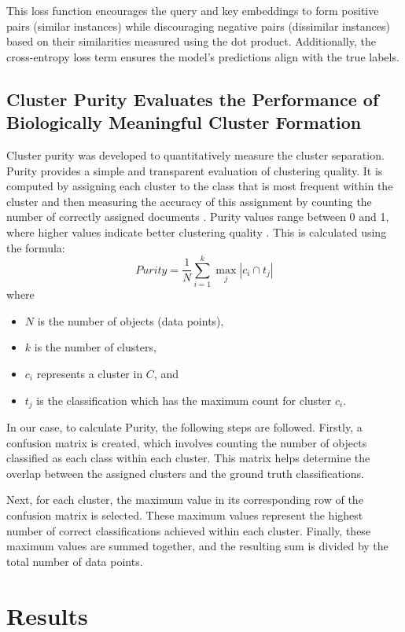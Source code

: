 \documentclass[12pt,a4paper]{article}
\begin{document}
This loss function encourages the query and key embeddings to form positive pairs (similar instances) while discouraging negative pairs (dissimilar instances) based on their similarities measured using the dot product. Additionally, the cross-entropy loss term ensures the model's predictions align with the true labels.

\subsection{Cluster Purity Evaluates the Performance of Biologically Meaningful Cluster Formation}
\label{cp}

Cluster purity was developed to quantitatively measure the cluster separation. Purity provides a simple and transparent evaluation of clustering quality. It is computed by assigning each cluster to the class that is most frequent within the cluster and then measuring the accuracy of this assignment by counting the number of correctly assigned documents \cite{ISBN_0521865719}. Purity values range between 0 and 1, where higher values indicate better clustering quality \cite{ISBN_0521865719}. This is calculated using the formula:
$$
Purity = \frac{1}{N} \sum_{i=1}^{k} \max_j |c_i \cap t_j|
$$
where
\begin{itemize}
	\item $N$ is the number of objects (data points),
	\item $k$ is the number of clusters,
	\item $c_i$ represents a cluster in $C$, and
	\item $t_j$ is the classification which has the maximum count for cluster $c_i$.
\end{itemize}

In our case, to calculate Purity, the following steps are followed. Firstly, a confusion matrix is created, which involves counting the number of objects classified as each class within each cluster. This matrix helps determine the overlap between the assigned clusters and the ground truth classifications.

Next, for each cluster, the maximum value in its corresponding row of the confusion matrix is selected. These maximum values represent the highest number of correct classifications achieved within each cluster. Finally, these maximum values are summed together, and the resulting sum is divided by the total number of data points.


\newpage
\section{Results}
\end{document}
